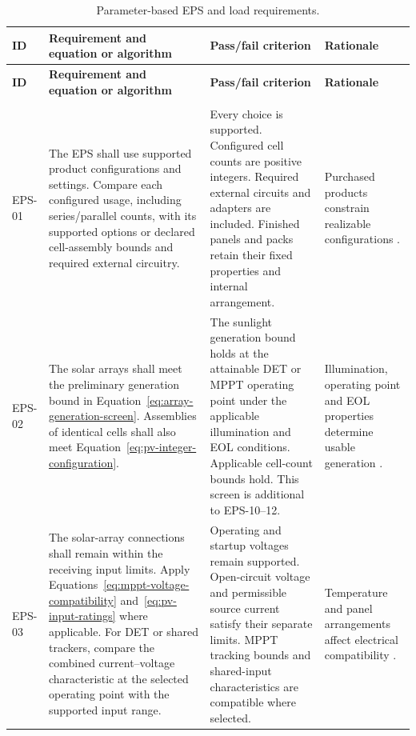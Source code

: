 \begingroup
\small
\setlength{\tabcolsep}{4pt}
\setlength{\parskip}{0pt}
\setlength{\LTpre}{0.4\baselineskip}
\setlength{\LTpost}{0.4\baselineskip}
\renewcommand{\arraystretch}{1.06}
\setlength{\ReportTableBodyWidth}{\dimexpr\linewidth-6\tabcolsep\relax}
\begin{longtable}{@{}P{0.09\ReportTableBodyWidth}P{0.37\ReportTableBodyWidth}P{0.29\ReportTableBodyWidth}P{0.25\ReportTableBodyWidth}@{}}
\caption{Parameter-based EPS and load requirements.}\label{tab:eps-parameter-requirements}\\
\toprule
\textbf{ID} & \textbf{Requirement and equation or algorithm} & \textbf{Pass/fail criterion} & \textbf{Rationale} \\
\midrule
\endfirsthead
\toprule
\textbf{ID} & \textbf{Requirement and equation or algorithm} & \textbf{Pass/fail criterion} & \textbf{Rationale} \\
\midrule
\endhead
\bottomrule
\endfoot
{} \\*
EPS-01\label{epsreq:EPS-01} & The EPS shall use supported product configurations and settings. Compare each configured usage, including series/parallel counts, with its supported options or declared cell-assembly bounds and required external circuitry. & Every choice is supported. Configured cell counts are positive integers. Required external circuits and adapters are included. Finished panels and packs retain their fixed properties and internal arrangement. & Purchased products constrain realizable configurations \citep[Sec.~III.A--B]{review-0145}. \\
EPS-02\label{epsreq:EPS-02} & The solar arrays shall meet the preliminary generation bound in Equation~\eqref{eq:array-generation-screen}. Assemblies of identical cells shall also meet Equation~\eqref{eq:pv-integer-configuration}. & The sunlight generation bound holds at the attainable DET or MPPT operating point under the applicable illumination and EOL conditions. Applicable cell-count bounds hold. This screen is additional to EPS-10--12. & Illumination, operating point and EOL properties determine usable generation \citep[Secs.~3--4]{review-0289}. \\
EPS-03\label{epsreq:EPS-03} & The solar-array connections shall remain within the receiving input limits. Apply Equations~\eqref{eq:mppt-voltage-compatibility} and~\eqref{eq:pv-input-ratings} where applicable. For DET or shared trackers, compare the combined current--voltage characteristic at the selected operating point with the supported input range. & Operating and startup voltages remain supported. Open-circuit voltage and permissible source current satisfy their separate limits. MPPT tracking bounds and shared-input characteristics are compatible where selected. & Temperature and panel arrangements affect electrical compatibility \citep[Secs.~3--4]{review-0289}\citep[Sec.~7.1]{handpicked-0003}. \\

\end{longtable}
